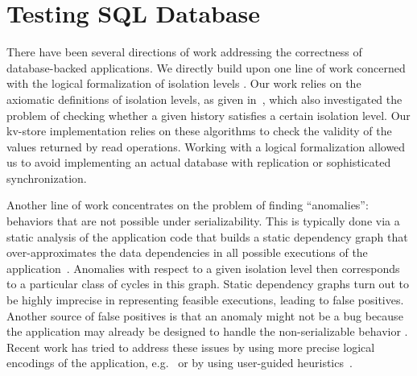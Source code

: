 
\section{Testing SQL Database}
\label{sec:related}


There have been several directions of work addressing the correctness of database-backed applications. 
We directly build upon one line of work concerned with the logical formalization
of isolation levels 
\cite{ansi,DBLP:conf/icde/AdyaLO00,DBLP:conf/sigmod/BerensonBGMOO95,DBLP:conf/concur/Cerone0G15,DBLP:journals/pacmpl/BiswasE19}.
Our work relies on the axiomatic definitions of isolation levels, as given
in~\cite{DBLP:journals/pacmpl/BiswasE19}, which also investigated
the problem of checking whether a given history satisfies a certain isolation
level. Our kv-store implementation relies on these algorithms 
to check the validity of the values returned by read operations. Working with a
logical formalization allowed us to avoid implementing an actual database with replication or
sophisticated synchronization.

Another line of work concentrates on the problem of finding ``anomalies'': 
behaviors that are not possible under serializability. This is typically done
via a static analysis of the application code that builds a static dependency graph that
over-approximates the data dependencies in all possible
executions of the application~\cite{DBLP:journals/jacm/CeroneG18,DBLP:journals/jacm/CeroneG18,DBLP:conf/concur/0002G16,DBLP:journals/tods/FeketeLOOS05,DBLP:conf/vldb/JorwekarFRS07,DBLP:conf/sigmod/WarszawskiB17,DBLP:journals/pvldb/GanRRB020}.
Anomalies with respect to a given isolation level then corresponds to a
particular class of cycles in this graph. Static dependency graphs turn out to
be highly imprecise in representing feasible executions, leading to false
positives. Another source of false positives is that an anomaly might not be a
bug because the application may already be designed to handle the
non-serializable behavior \cite{DBLP:conf/pldi/BrutschyD0V18,DBLP:journals/pvldb/GanRRB020}. 
Recent work has tried to address these issues by using more precise 
logical encodings of the application,
e.g.~\cite{DBLP:conf/popl/BrutschyD0V17,DBLP:conf/pldi/BrutschyD0V18} or
by using user-guided heuristics~\cite{DBLP:journals/pvldb/GanRRB020}. 

